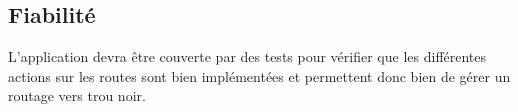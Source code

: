 \subsection{Fiabilité}
L'application devra être couverte par des tests pour vérifier que les différentes actions sur les routes sont bien implémentées et permettent donc bien de gérer un routage vers trou noir. %



